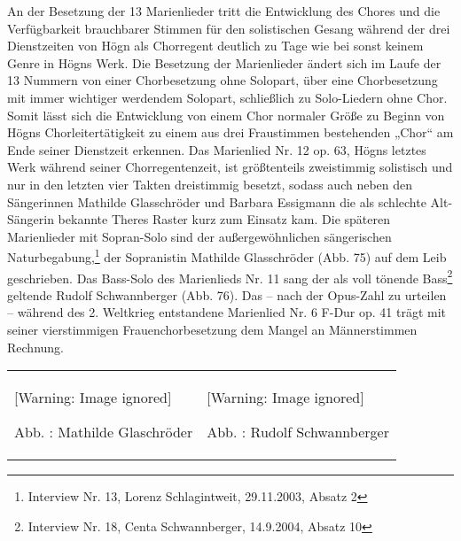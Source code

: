 \documentclass[a4paper]{article}
\newcounter{Abb}
\renewcommand\theAbb{\arabic{Abb}}
\begin{document}
An der Besetzung der 13 Marienlieder tritt die Entwicklung des Chores
und die Verfügbarkeit brauchbarer Stimmen für den solistischen Gesang
während der drei Dienstzeiten von Högn als Chorregent deutlich zu Tage
wie bei sonst keinem Genre in Högns Werk. Die Besetzung der
Marienlieder ändert sich im Laufe der 13 Nummern von einer
Chorbesetzung ohne Solopart, über eine Chorbesetzung mit immer
wichtiger werdendem Solopart, schließlich zu Solo-Liedern ohne Chor.
Somit lässt sich die Entwicklung von einem Chor normaler Größe zu
Beginn von Högns Chorleitertätigkeit zu einem aus drei Fraustimmen
bestehenden „Chor“ am Ende seiner Dienstzeit erkennen. Das Marienlied
Nr. 12 op. 63, Högns letztes Werk während seiner Chorregentenzeit, ist
größtenteils zweistimmig solistisch und nur in den letzten vier Takten
dreistimmig besetzt, sodass auch neben den Sängerinnen Mathilde
Glasschröder und Barbara Essigmann die als schlechte Alt-Sängerin
bekannte Theres Raster kurz zum Einsatz kam. Die späteren Marienlieder
mit Sopran-Solo sind der außergewöhnlichen sängerischen
Naturbegabung,\footnote{ Interview Nr. 13, Lorenz Schlagintweit,
29.11.2003, Absatz 2} der Sopranistin Mathilde Glasschröder (Abb. 75)
auf dem Leib geschrieben. Das Bass-Solo des Marienlieds Nr. 11 sang der
als voll tönende Bass\footnote{ Interview Nr. 18, Centa Schwannberger,
14.9.2004, Absatz 10} geltende Rudolf Schwannberger (Abb. 76). Das –
nach der Opus-Zahl zu urteilen – während des 2. Weltkrieg entstandene
Marienlied Nr. 6 F-Dur op. 41 trägt mit seiner vierstimmigen
Frauenchorbesetzung dem Mangel an Männerstimmen Rechnung.

\begin{center}
\begin{minipage}{9.096cm}
\begin{flushleft}
\tablefirsthead{}
\tablehead{}
\tabletail{}
\tablelasttail{}
\begin{supertabular}{m{4.335cm}m{4.361cm}}
  [Warning: Image ignored] %
 
\label{bkm:Ref100231023}Abb. \stepcounter{Abb}{\theAbb}: Mathilde
Glaschröder &
  [Warning: Image ignored] %
 
\label{bkm:Ref100234796}Abb. \stepcounter{Abb}{\theAbb}: Rudolf
Schwannberger\\
\end{supertabular}
\end{flushleft}
\end{minipage}
\end{center}
\end{document}
